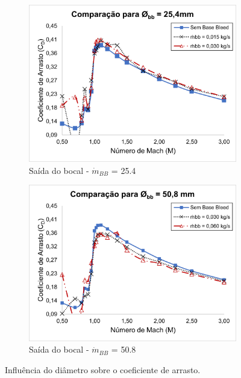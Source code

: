 \begin{figure}[!ht]
	\centering
	\begin{subfigure}[b]{0.47\textwidth}
    	\centering
    	\includegraphics[width=\textwidth]{cd-combasebleed-diametro-1pol.png}
    	\caption{Saída do bocal - \(\Dot{m}_{BB}\) = \qty{25,4}{\millimetre}}
    	\label{fig:comparacao-bb-diametro-1pol}
    \end{subfigure}
    \hfill
	\begin{subfigure}[b]{0.47\textwidth}
    	\centering
    	\includegraphics[width=\textwidth]{cd-combasebleed-diametro-2pol.png}
    	\caption{Saída do bocal - \(\Dot{m}_{BB}\) = \qty{50,8}{\millimetre}}
    	\label{fig:comparacao-bb-diametro-2pol}
    \end{subfigure}
	\caption{Influência do diâmetro sobre o coeficiente de arrasto.}
	\label{fig:comparacao-bb-diametro-vazoes}
\end{figure}

